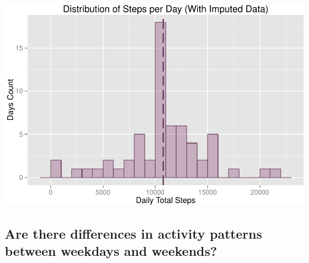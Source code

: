 \documentclass[]{article}
\begin{document}
\includegraphics{PA1_template_files/figure-latex/unnamed-chunk-5-1.pdf}

\subsection{Are there differences in activity patterns between weekdays
and
weekends?}\label{are-there-differences-in-activity-patterns-between-weekdays-and-weekends}
\end{document}
